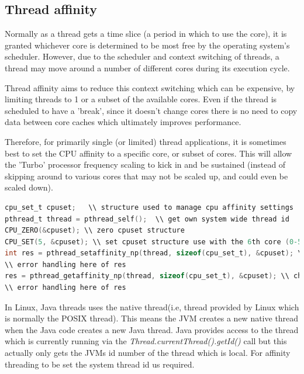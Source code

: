 \documentclass[final_report.tex]{subfiles}
\begin{document}
\subsection{Thread affinity}
Normally as a thread gets a time slice (a period in which to use the core), it is granted whichever core is determined to be most free by the operating system's scheduler. However, due to the scheduler and context switching of threads, a thread may move around a number of different cores during its execution cycle.

Thread affinity aims to reduce this context switching which can be expensive, by limiting threads to 1 or a subset of the available cores. Even if the thread is scheduled to have a 'break', since it doesn't change cores there is no need to copy data between core caches which ultimately improves performance. 

Therefore, for primarily single (or limited) thread applications, it is sometimes best to set the CPU affinity to a specific core, or subset of cores. This will allow the 'Turbo' processor frequency scaling to kick in and be sustained (instead of skipping around to various cores that may not be scaled up, and could even be scaled down).

\begin{lstlisting}[language=C, caption={Example of setting thread affinity}, label=lst:c_affinity]
cpu_set_t cpuset;	\\ structure used to manage cpu affinity settings
pthread_t thread = pthread_self();  \\ get own system wide thread id
CPU_ZERO(&cpuset); \\ zero cpuset structure
CPU_SET(5, &cpuset); \\ set cpuset structure use with the 6th core (0-5)
int res = pthread_setaffinity_np(thread, sizeof(cpu_set_t), &cpuset); \\ set affinity of thread
\\ error handling here of res
res = pthread_getaffinity_np(thread, sizeof(cpu_set_t), &cpuset); \\ check affinity of thread
\\ error handling here of res
\end{lstlisting}

In Linux, Java threads uses the native thread(i.e, thread provided by Linux which is normally the POSIX thread). This means the JVM creates a new native thread when the Java code creates a new Java thread. Java provides access to the thread which is currently running via the \textit{Thread.currentThread().getId()} call but this actually only gets the JVMs id number of the thread which is local. For affinity threading to be set the system thread id us required.
\end{document}
